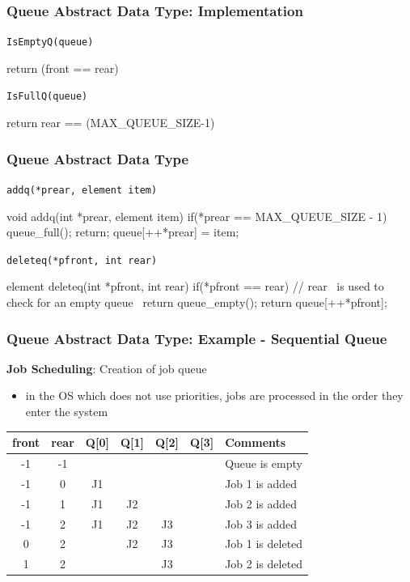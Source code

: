 \documentclass[newPxFont,sthlmFooter,nooffset]{beamer}
\begin{document}
\begin{frame}[t, fragile]
  \frametitle{Queue Abstract Data Type: Implementation}
\texttt{IsEmptyQ(queue)}
\begin{codedef}
return (front == rear)
\end{codedef}
\texttt{IsFullQ(queue)}
\begin{codedef}
return rear == (MAX_QUEUE_SIZE-1)
\end{codedef}


\end{frame}

\begin{frame}[t, fragile]
  \frametitle{Queue Abstract Data Type}
\texttt{addq(*prear, element item)}
\begin{ncodedef}
void addq(int *prear, element item){
    if(*prear == MAX_QUEUE_SIZE - 1){
        queue_full();
        return;
    }
    queue[++*prear] = item;
}
\end{ncodedef}

\texttt{deleteq(*pfront, int rear)}
\begin{ncodedef}
element deleteq(int *pfront, int rear){
    if(*pfront == rear){ // rear ~is used to check for an empty queue~
        return queue_empty();
    }
    return queue[++*pfront];
}
\end{ncodedef}
\end{frame}

\begin{frame}[t]
  \frametitle{Queue Abstract Data Type: Example - Sequential Queue}
\textbf{Job Scheduling}: Creation of job queue
\begin{itemize}
\item in the OS which does not use priorities, jobs are processed in the order they enter the system
\end{itemize}
\begin{tabular}{c | c | c c c c | l}
  front & rear & Q[0] & Q[1] & Q[2] & Q[3] & Comments \\ \hline \hline
    -1  &  -1  &      &      &      &      & Queue is empty \\
    -1  &   0  &  J1  &      &      &      & Job 1 is added \\
    -1  &   1  &  J1  &  J2  &      &      & Job 2 is added \\
    -1  &   2  &  J1  &  J2  &  J3  &      & Job 3 is added \\
     0  &   2  &      &  J2  &  J3  &      & Job 1 is deleted \\
     1  &   2  &      &      &  J3  &      & Job 2 is deleted \\
\end{tabular}
\end{frame}
\end{document}
